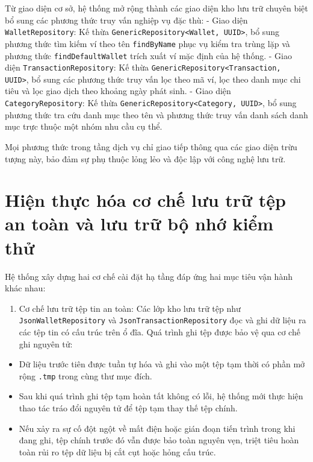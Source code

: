 \documentclass[a4paper,12pt]{report}
\providecommand{\tightlist}{%
  \setlength{\itemsep}{0pt}\setlength{\parskip}{0pt}}
\newcommand{\passthrough}[1]{#1}
\begin{document}
Từ giao diện cơ sở, hệ thống mở rộng thành các giao diện kho lưu trữ
chuyên biệt bổ sung các phương thức truy vấn nghiệp vụ đặc thù: - Giao
diện \passthrough{\lstinline!WalletRepository!}: Kế thừa
\passthrough{\lstinline!GenericRepository<Wallet, UUID>!}, bổ sung
phương thức tìm kiếm ví theo tên \passthrough{\lstinline!findByName!}
phục vụ kiểm tra trùng lặp và phương thức
\passthrough{\lstinline!findDefaultWallet!} trích xuất ví mặc định của
hệ thống. - Giao diện \passthrough{\lstinline!TransactionRepository!}:
Kế thừa \passthrough{\lstinline!GenericRepository<Transaction, UUID>!},
bổ sung các phương thức truy vấn lọc theo mã ví, lọc theo danh mục chi
tiêu và lọc giao dịch theo khoảng ngày phát sinh. - Giao diện
\passthrough{\lstinline!CategoryRepository!}: Kế thừa
\passthrough{\lstinline!GenericRepository<Category, UUID>!}, bổ sung
phương thức tra cứu danh mục theo tên và phương thức truy vấn danh sách
danh mục trực thuộc một nhóm nhu cầu cụ thể.

Mọi phương thức trong tầng dịch vụ chỉ giao tiếp thông qua các giao diện
trừu tượng này, bảo đảm sự phụ thuộc lỏng lẻo và độc lập với công nghệ
lưu trữ.

\section{Hiện thực hóa cơ chế lưu trữ tệp an toàn và lưu trữ bộ nhớ kiểm
thử}\label{hiux1ec7n-thux1ef1c-huxf3a-cux1a1-chux1ebf-lux1b0u-trux1eef-tux1ec7p-an-touxe0n-vuxe0-lux1b0u-trux1eef-bux1ed9-nhux1edb-kiux1ec3m-thux1eed}

Hệ thống xây dựng hai cơ chế cài đặt hạ tầng đáp ứng hai mục tiêu vận
hành khác nhau:

\begin{enumerate}
\def\labelenumi{\arabic{enumi}.}
\tightlist
\item
  Cơ chế lưu trữ tệp tin an toàn: Các lớp kho lưu trữ tệp như
  \passthrough{\lstinline!JsonWalletRepository!} và
  \passthrough{\lstinline!JsonTransactionRepository!} đọc và ghi dữ liệu
  ra các tệp tin có cấu trúc trên ổ đĩa. Quá trình ghi tệp được bảo vệ
  qua cơ chế ghi nguyên tử:
\end{enumerate}

\begin{itemize}
\tightlist
\item
  Dữ liệu trước tiên được tuần tự hóa và ghi vào một tệp tạm thời có
  phần mở rộng \passthrough{\lstinline!.tmp!} trong cùng thư mục đích.
\item
  Sau khi quá trình ghi tệp tạm hoàn tất không có lỗi, hệ thống mới thực
  hiện thao tác tráo đổi nguyên tử để tệp tạm thay thế tệp chính.
\item
  Nếu xảy ra sự cố đột ngột về mất điện hoặc gián đoạn tiến trình trong
  khi đang ghi, tệp chính trước đó vẫn được bảo toàn nguyên vẹn, triệt
  tiêu hoàn toàn rủi ro tệp dữ liệu bị cắt cụt hoặc hỏng cấu trúc.
\end{itemize}
\end{document}
